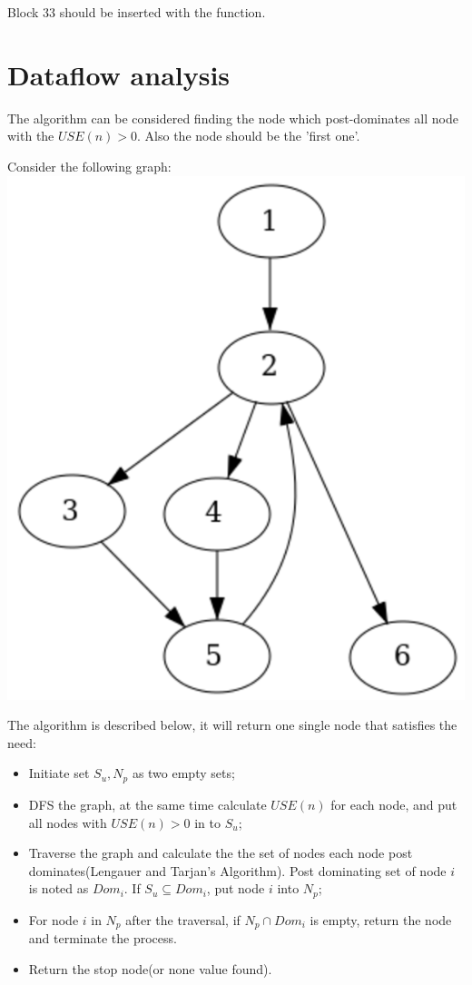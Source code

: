 \documentclass[12pt]{article}
\begin{document}
Block 33 should be inserted with the function.

\section{ Dataflow analysis}

The algorithm can be considered finding the node which  post-dominates
all node with the $USE(n)>0$. Also the node should be the 'first
one'.

Consider the following graph:
\includegraphics[scale=0.5]{pic1.png}

The algorithm is described below, it will return one single node that
satisfies the need:
\begin{itemize}
\item Initiate set $S_{u}, N_{p}$ as two empty sets;
\item DFS the graph, at the same time calculate $USE(n)$ for each
  node, and put all nodes with $USE(n)>0$ in to $S_{u}$;
\item Traverse the graph and calculate the the set of nodes each node post dominates(Lengauer
  and Tarjan’s Algorithm). Post dominating set of node $i$ is noted as
  $Dom_{i}$. If $S_{u} \subseteq Dom_{i}$, put node $i$ into $N_{p}$;
\item For node $i$ in $N_{p}$ after the traversal, if $N_{p} \cap
  Dom_{i}$ is empty, return the node and terminate the process.
\item Return the stop node(or none value found).
\end{itemize}
\end{document}
